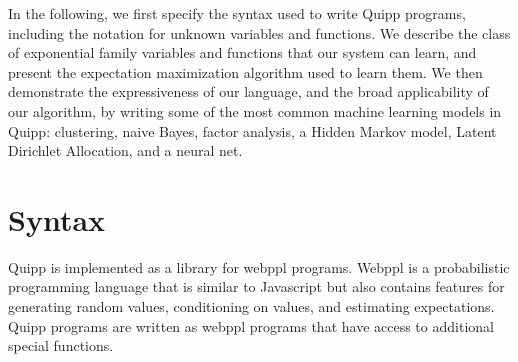 \documentclass{article}
\begin{document}




  In the following, we first specify the syntax used to write Quipp programs,
  including the notation for unknown variables and functions.
  We describe the class of exponential family variables and functions that our system can learn,
  and present the expectation maximization algorithm used to learn them.
  We then demonstrate the expressiveness of our language, and the broad
  applicability of our algorithm, by writing some of the most common machine learning models
  in Quipp: clustering, naive Bayes, factor analysis, a Hidden Markov model, Latent Dirichlet Allocation, and
  a neural net.
  
  \section{Syntax}

  Quipp is implemented as a library for webppl programs.  Webppl \cite{dippl} is a probabilistic programming language
  that is similar to Javascript but also contains features for generating random values, conditioning on values,
  and estimating expectations. Quipp programs are written as webppl programs that have access to additional special functions.
\end{document}

